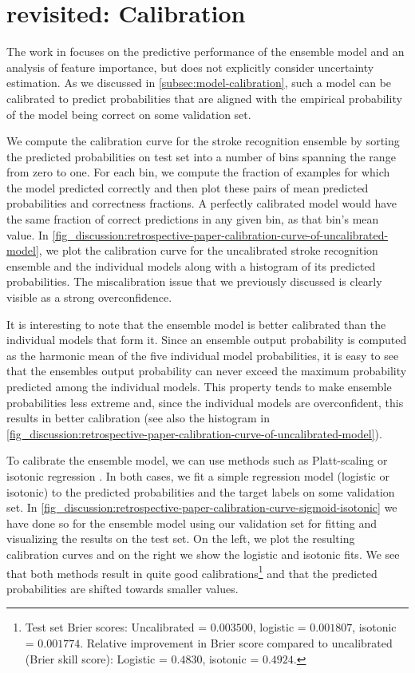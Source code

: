 \section{ revisited: Calibration}
The work in \textcite{wenstrup_retrospective_2023} focuses on the predictive performance of the ensemble model and an analysis of feature importance, but does not explicitly consider uncertainty estimation. 
As we discussed in \cref{subsec:model-calibration}, such a model can be calibrated to predict probabilities that are aligned with the empirical probability of the model being correct on some validation set.

We compute the calibration curve for the stroke recognition ensemble by sorting the predicted probabilities on test set into a number of bins spanning the range from zero to one. For each bin, we compute the fraction of examples for which the model predicted correctly and then plot these pairs of mean predicted probabilities and correctness fractions. A perfectly calibrated model would have the same fraction of correct predictions in any given bin, as that bin's mean value. 
In \cref{fig_discussion:retrospective-paper-calibration-curve-of-uncalibrated-model}, we plot the calibration curve for the uncalibrated stroke recognition ensemble and the individual models along with a histogram of its predicted probabilities. The miscalibration issue that we previously discussed is clearly visible as a strong overconfidence. 

It is interesting to note that the ensemble model is better calibrated than the individual models that form it. Since an ensemble output probability is computed as the harmonic mean of the five individual model probabilities, it is easy to see that the ensembles output probability can never exceed the maximum probability predicted among the individual models. This property tends to make ensemble probabilities less extreme and, since the individual models are overconfident, this results in better calibration (see also the histogram in \cref{fig_discussion:retrospective-paper-calibration-curve-of-uncalibrated-model}). 

To calibrate the ensemble model, we can use methods such as Platt-scaling \parencite{platt_probabilistic_1999} or isotonic regression \parencite{zadrozny_transforming_2002}. 
In both cases, we fit a simple regression model (logistic or isotonic) to the predicted probabilities and the target labels on some validation set. 
In \cref{fig_discussion:retrospective-paper-calibration-curve-sigmoid-isotonic} we have done so for the ensemble model using our validation set for fitting and visualizing the results on the test set. On the left, we plot the resulting calibration curves and on the right we show the logistic and isotonic fits. We see that both methods result in quite good calibrations\footnote{Test set Brier scores: Uncalibrated = $0.003500$, logistic = $0.001807$, isotonic = $0.001774$. Relative improvement in Brier score compared to uncalibrated (Brier skill score): Logistic = $0.4830$, isotonic = $0.4924$.} and that the predicted probabilities are shifted towards smaller values. 

